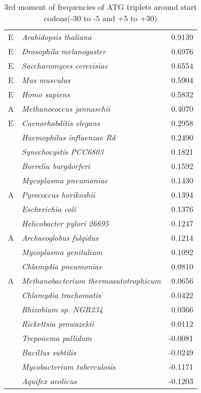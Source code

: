 \begin{table}
\begin{center}
\begin{tabular}{|c|l|r|}
E& {\it Arabidopsis thaliana   } & 0.9139 \\
E& {\it Drosophila melanogaster   } & 0.6976 \\
E& {\it Saccharomyces cerevisiae   } & 0.6554 \\
E& {\it Mus musculus   } & 0.5904 \\
E& {\it Homo sapiens   } & 0.5832 \\
A& {\it Methanococcus jannaschii   } & 0.4070 \\
E& {\it Caenorhabditis elegans   } & 0.2958 \\
& {\it Haemophilus influenzae Rd  } & 0.2490 \\
& {\it Synechocystis PCC6803   } & 0.1821 \\
& {\it Borrelia burgdorferi   } & 0.1592 \\
& {\it Mycoplasma pneumoniae   } & 0.1430 \\
A& {\it Pyrococcus horikoshii   } & 0.1394 \\
& {\it Escherichia coli   } & 0.1376 \\
& {\it Helicobacter pylori 26695  } & 0.1247 \\
A& {\it Archaeoglobus fulgidus   } & 0.1214 \\
& {\it Mycoplasma genitalium   } & 0.1092 \\
& {\it Chlamydia pneumoniae   } & 0.0810 \\
A& {\it Methanobacterium thermoautotrophicum   } & 0.0656 \\
& {\it Chlamydia trachomatis   } & 0.0422 \\
& {\it Rhizobium sp. NGR234  } & 0.0366 \\
& {\it Rickettsia prowazekii   } & 0.0112 \\
& {\it Treponema pallidum   } & -0.0081 \\
& {\it Bacillus subtilis   } & -0.0249 \\
& {\it Mycobacterium tuberculosis   } & -0.1171 \\
& {\it Aquifex aeolicus   } & -0.1203 \\
\end{tabular}
\end{center}
\caption{3rd moment of frequencies of ATG triplets around start codons(-30 to -5 and +5 to +30)}
\label{moment_atg}
\end{table}


